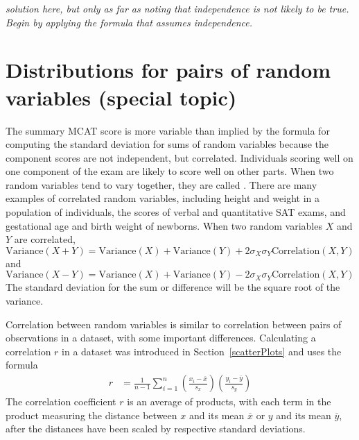 \textit{solution here, but only as far as noting that independence is not likely to be true.  Begin by applying the formula that assumes independence.}


\section{Distributions for pairs of random variables (special topic)}


The summary MCAT score is more variable than implied by the formula for computing the standard deviation for sums of random variables because the component scores are not independent, but correlated. Individuals scoring well on one component of the exam are likely to score well on other parts.  When two random variables tend to vary together, they are called .  There are many examples of correlated random variables, including height and weight in a population of individuals, the scores of verbal and quantitative SAT exams, and gestational age and birth weight of newborns.  When two random variables $X$ and $Y$ are correlated,
\begin{equation*} 
	\text{Variance}(X + Y) = \text{Variance}(X) + \text{Variance}(Y) + 
	2 \sigma_X \sigma_Y\text{Correlation}(X,Y) 
	\label{eq:generalVarianceSumRVs}
\end{equation*}
and
\begin{equation*}
	\text{Variance}(X - Y) = \text{Variance}(X) + \text{Variance}(Y) - 
	2 \sigma_X \sigma_Y\text{Correlation}(X,Y) 
	\label{eq:generalVarianceDiffRVs}
\end{equation*}
The standard deviation for the sum or difference will be the square root of the variance.

Correlation between random variables is similar to correlation between pairs of observations in a dataset, with some important differences.  Calculating a correlation $r$ in a dataset was introduced in Section~\ref{scatterPlots} and uses the formula 
\begin{align*}
      r &=  \frac{1}{n-1}\sum^{n}_{i=1}
      \left(\frac{x_{i}-\overline{x}}
      {s_{x}}\right)\left(\frac{y_{i}-\overline{y}}{s_{y}}\right)
\end{align*} 
The correlation coefficient $r$ is an average of products, with each term in the product measuring the distance between $x$ and its mean $\overline{x}$ or $y$ and its mean $\overline{y}$, after the distances have been scaled by respective standard deviations.

